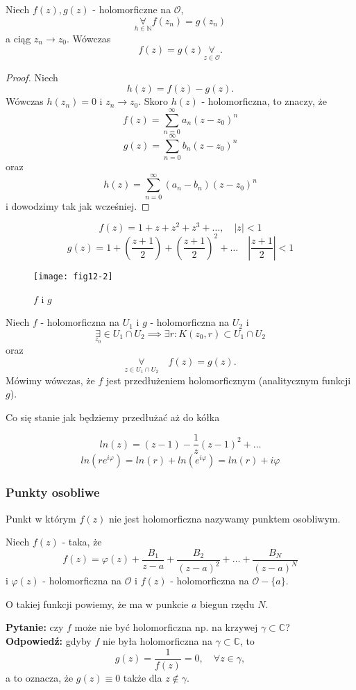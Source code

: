 \documentclass[../main.tex]{subfiles}
\begin{document}
\begin{tw}
    Niech $f(z),g(z)$ - holomorficzne na $\mathcal{O}$,
    \[
        \underset{h \in \mathbb{N}}{\forall} f(z_n) = g(z_n)
    \]
    a ciąg $z_n\to z_0$. Wówczas
    \[
        f(z) = g(z) \underset{z\in \mathcal{O}}{\forall}
    .\]
\end{tw}
\begin{proof}
    Niech
    \[
        h(z) = f(z) - g(z)
    .\]
Wówczas $h(z_n) = 0$ i $z_n\to z_0$. Skoro $h(z)$ - holomorficzna, to znaczy, że
    \[
        f(z) = \sum_{n = 0}^{\infty} a_n (z-z_0)^n
    \]
    \[
        g(z) = \sum_{n = 0}^{\infty} b_n (z-z_0)^n
    \]
    oraz
    \[
        h(z) = \sum_{n = 0}^{\infty} (a_n - b_n) (z-z_0)^n
    \]
    i dowodzimy tak jak wcześniej.
\end{proof}
\begin{przyklad}
    \[
        f(z) = 1 + z + z^2 + z^3 + \dots,\quad |z| < 1
    \]
    \[
        g(z) = 1 + \left(\frac{z+1}{2}\right) + \left(\frac{z+1}{2}\right)^2 + \dots\quad \left| \frac{z+1}{2} \right| < 1
    \]
\begin{figure}[h]
    \center
    \texttt{[image: fig12-2]}
    \caption{$f$ i $g$}
\end{figure}
\end{przyklad}
\begin{definicja}
    Niech $f$ - holomorficzna na $U_1$ i $g$ - holomorficzna na $U_2$ i
    \[
        \underset{z_0}{\exists} \in U_1\cap U_2 \implies \exists r: K(z_0,r) \subset U_1\cap U_2
    \]
    oraz
    \[
        \underset{z\in U_1\cap U_2}{\forall}\quad f(z) = g(z)
    .\]
Mówimy wówczas, że $f$ jest przedłużeniem holomorficznym (analitycznym funkcji $g$).
\end{definicja}
\begin{przyklad}
    Co się stanie jak będziemy przedłużać aż do kółka

    \[
        ln(z) = (z - 1) - \frac{1}{z}(z-1)^2 + \dots
    \]
    \[
        ln(re^{i\varphi}) = ln(r) + ln\left(e^{i\varphi}\right) = ln(r) + i\varphi
    \]
\end{przyklad}
\subsubsection{Punkty osobliwe}
\begin{definicja}
    Punkt w którym $f(z)$ nie jest holomorficzna nazywamy punktem osobliwym.
\end{definicja}
\begin{definicja}
    Niech $f(z)$ - taka, że
    \[
        f(z) = \varphi(z) + \frac{B_1}{z - a} + \frac{B_2}{(z - a)^2} + \dots + \frac{B_N}{(z-a)^N}
    \]
    i $\varphi(z)$ - holomorficzna na $\mathcal{O}$ i $f(z)$ - holomorficzna na $\mathcal{O} - \{a\}$.

    O takiej funkcji powiemy, że ma w punkcie $a$ biegun rzędu $N$.
\end{definicja}
\textbf{Pytanie: } czy $f$ może nie być holomorficzna np. na krzywej $\gamma \subset \mathbb{C}$?\\
\textbf{Odpowiedź: } gdyby $f$ nie była holomorficzna na $\gamma \subset \mathbb{C}$, to
\[
    g(z) = \frac{1}{f(z)} = 0,\quad \forall z\in \gamma
,\]
a to oznacza, że $g(z) \equiv 0$ także dla $z\not\in \gamma$.
\end{document}
